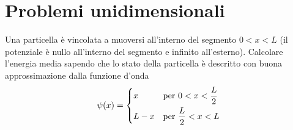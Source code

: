 \chapter{Problemi unidimensionali}

\begin{esercizio}[(07/10/2020 n°4)]
   Una particella è vincolata a muoversi all'interno del segmento $0<x<L$ (il potenziale è nullo all'interno del segmento e infinito all'esterno). Calcolare l'energia media sapendo che lo stato della particella è descritto con buona approssimazione dalla funzione d'onda
   \begin{equation*}
      \psi(x)=
      \begin{dcases}
         x & \text{per } 0<x<\frac{L}{2}\\
         L-x & \text{per } \frac{L}{2}<x<L
      \end{dcases}
   \end{equation*}
\end{esercizio}
